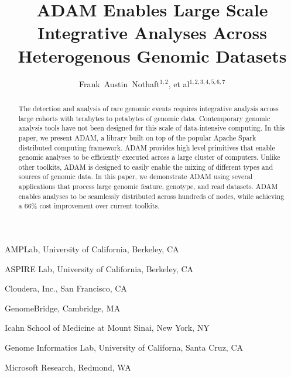 \documentclass{nature}
\title{ADAM Enables Large Scale Integrative Analyses Across Heterogenous Genomic Datasets}
\author{Frank~Austin~Nothaft$^{1, 2}$, et al$^{1, 2, 3, 4, 5, 6, 7}$}
\begin{document}
\maketitle

\begin{affiliations}
\item AMPLab, University of California, Berkeley, CA
\item ASPIRE Lab, University of California, Berkeley, CA
\item Cloudera, Inc., San Francisco, CA
\item GenomeBridge, Cambridge, MA
\item Icahn School of Medicine at Mount Sinai, New York, NY
\item Genome Informatics Lab, University of Californa, Santa Cruz, CA
\item Microsoft Research, Redmond, WA
\end{affiliations}

\begin{abstract}

The detection and analysis of rare genomic events requires integrative analysis across
large cohorts with terabytes to petabytes of genomic data. Contemporary genomic analysis tools
have not been designed for this scale of data-intensive computing. In this paper, we present
ADAM, a library built on top of the popular Apache Spark distributed computing framework.
ADAM provides high level primitives that enable genomic analyses to be efficiently executed
across a large cluster of computers. Unlike other toolkits, ADAM is designed to easily enable
the mixing of different types and sources of genomic data. In this paper, we demonstrate ADAM
using several applications that process large genomic feature, genotype, and read datasets.
ADAM enables analyses to be seamlessly distributed across hundreds of nodes, while achieving a
66\% cost improvement over current toolkits.
\end{abstract}
\end{document}
